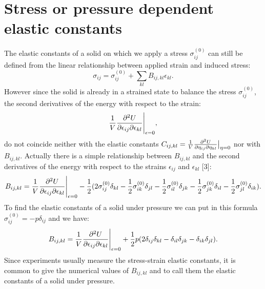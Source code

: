 \documentclass[12pt,a4paper,twoside]{report}
\begin{document}
\newpage
{\color{dark-blue}\chapter{Stress or pressure dependent elastic constants}}
\color{black}

The elastic constants of a solid on which we apply a stress 
$\sigma^{(0)}_{ij}$ can still
be defined from the linear relationship between applied strain and 
induced stress: 
\begin{equation}
\sigma_{ij} =\sigma^{(0)}_{ij}+\sum_{kl} B_{ij,kl} \epsilon_{kl}.
\end{equation}
However since the solid is already in a strained state
to balance the stress $\sigma^{(0)}_{ij}$, the second derivatives of
the energy with respect to the strain:
\begin{equation}
{1 \over V}{\partial^2 U \over \partial \epsilon_{ij} \partial \epsilon_{kl}}
\Bigg|_{\epsilon=0},
\end{equation}
do not coincide neither with the elastic constants
$C_{ij,kl}={1 \over V}{\partial^2 U \over \partial \eta_{ij} \partial 
\eta_{kl}}\big|_{\eta=0}$ nor with $B_{ij,kl}$. Actually there is a simple 
relationship between $B_{ij,kl}$ and the 
second derivatives of the energy with respect to the strains
$\epsilon_{ij}$ and $\epsilon_{kl}$ [3]:
\begin{equation}
B_{ij,kl} = {1 \over V}{\partial^2 U \over \partial \epsilon_{ij} 
\partial \epsilon_{kl}}\Bigg|_{\epsilon=0} - 
{1\over 2} (2 \sigma^{(0)}_{ij} \delta_{kl} 
-{1\over 2} \sigma^{(0)}_{ik} \delta_{jl} 
-{1\over 2} \sigma^{(0)}_{il} \delta_{jk} 
-{1\over 2} \sigma^{(0)}_{jk} \delta_{il} 
-{1\over 2} \sigma^{(0)}_{jl} \delta_{ik} ).
\label{eqsd2}
\end{equation}
To find the elastic constants of a solid under pressure we can
put in this formula $\sigma^{(0)}_{ij}=-p \delta_{ij}$ and we
have:
\begin{equation}
B_{ij,kl} = {1 \over V}{\partial^2 U \over \partial \epsilon_{ij} 
\partial \epsilon_{kl}}\Bigg|_{\epsilon=0} + 
{1\over 2} p (2 \delta_{ij} \delta_{kl} - 
 \delta_{il} \delta_{jk} - \delta_{ik} \delta_{jl} ).
\end{equation}
Since experiments usually measure the stress-strain elastic constants,
it is common to give the numerical values of $B_{ij,kl}$ and to call them 
the elastic constants of a solid under pressure. 
\end{document}

